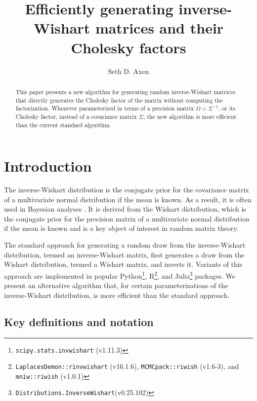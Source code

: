 \documentclass[12pt,a4paper,reqno]{amsart}
\numberwithin{equation}{section}
\begin{document}
\title[Efficiently generating inverse-Wishart matrices]{Efficiently generating inverse-Wishart matrices and their Cholesky factors}
\author{Seth D. Axen}
\address{University of Tübingen, Germany}

\begin{abstract}
    This paper presents a new algorithm for generating random inverse-Wishart matrices that directly generates the Cholesky factor of the matrix without computing the factorization.
    Whenever parameterized in terms of a precision matrix $\Omega=\Sigma^{-1}$, or its Cholesky factor, instead of a covariance matrix $\Sigma$, the new algorithm is more efficient than the current standard algorithm.
\end{abstract}

\maketitle

\section{Introduction}

The inverse-Wishart distribution is the conjugate prior for the covariance matrix of a multivariate normal distribution if the mean is known.
As a result, it is often used in Bayesian analyses \parencite{gelman_bayesian_2013,hoff_multivariate_2009}.
It is derived from the Wishart distribution, which is the conjugate prior for the precision matrix of a multivariate normal distribution if the mean is known and is a key object of interest in random matrix theory.

The standard approach for generating a random draw from the inverse-Wishart distribution, termed an inverse-Wishart matrix, first generates a draw from the Wishart distribution, termed a Wishart matrix, and inverts it.
Variants of this approach are implemented in popular Python\footnote{\texttt{scipy.stats.invwishart} (v1.11.3)}, R\footnote{\texttt{LaplacesDemon::rinvwishart} (v16.1.6), \texttt{MCMCpack::riwish} (v1.6-3), and \texttt{mniw::riwish} (v1.0.1)}, and Julia\footnote{\texttt{Distributions.InverseWishart}(v0.25.102)} packages.
We present an alternative algorithm that, for certain parameterizations of the inverse-Wishart distribution, is more efficient than the standard approach.

\subsection*{Key definitions and notation}
\end{document}
